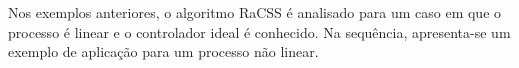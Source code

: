 

Nos exemplos anteriores, o algoritmo RaCSS é analisado para um caso em que o processo é linear e o controlador ideal é conhecido. Na sequência, apresenta-se um exemplo de aplicação para um processo não linear.






%
%
%
%
